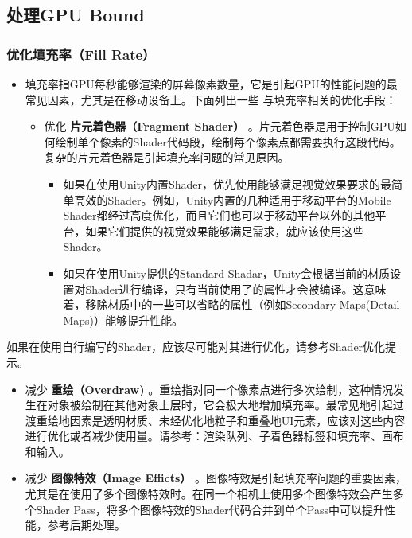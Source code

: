 \documentclass[9pt, b5paper]{article}
\begin{document}
\subsection{处理GPU Bound}
\label{sec-6-4}
\subsubsection{优化填充率（Fill Rate）}
\label{sec-6-4-1}
\begin{itemize}
\item 填充率指GPU每秒能够渲染的屏幕像素数量，它是引起GPU的性能问题的最常见因素，尤其是在移动设备上。下面列出一些 与填充率相关的优化手段：
\begin{itemize}
\item 优化 \textbf{片元着色器（Fragment Shader）} 。片元着色器是用于控制GPU如何绘制单个像素的Shader代码段，绘制每个像素点都需要执行这段代码。复杂的片元着色器是引起填充率问题的常见原因。 
\begin{itemize}
\item 如果在使用Unity内置Shader，优先使用能够满足视觉效果要求的最简单高效的Shader。例如，Unity内置的几种适用于移动平台的Mobile Shader都经过高度优化，而且它们也可以于移动平台以外的其他平台，如果它们提供的视觉效果能够满足需求，就应该使用这些Shader。
\item 如果在使用Unity提供的Standard Shadar，Unity会根据当前的材质设置对Shader进行编译，只有当前使用了的属性才会被编译。这意味着，移除材质中的一些可以省略的属性（例如Secondary Maps(Detail Maps)）能够提升性能。
\end{itemize}
\end{itemize}
\end{itemize}
如果在使用自行编写的Shader，应该尽可能对其进行优化，请参考Shader优化提示。
\begin{itemize}
\item 减少 \textbf{重绘（Overdraw)} 。重绘指对同一个像素点进行多次绘制，这种情况发生在对象被绘制在其他对象上层时，它会极大地增加填充率。最常见地引起过渡重绘地因素是透明材质、未经优化地粒子和重叠地UI元素，应该对这些内容进行优化或者减少使用量。请参考：渲染队列、子着色器标签和填充率、画布和输入。
\item 减少 \textbf{图像特效（Image Efficts）} 。图像特效是引起填充率问题的重要因素，尤其是在使用了多个图像特效时。在同一个相机上使用多个图像特效会产生多个Shader Pass，将多个图像特效的Shader代码合并到单个Pass中可以提升性能，参考后期处理。
\end{itemize}
\end{document}
